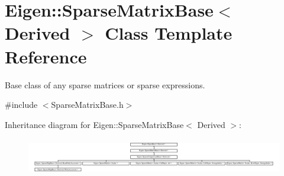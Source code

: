 \hypertarget{class_eigen_1_1_sparse_matrix_base}{}\section{Eigen\+::Sparse\+Matrix\+Base$<$ Derived $>$ Class Template Reference}
\label{class_eigen_1_1_sparse_matrix_base}


Base class of any sparse matrices or sparse expressions.  




{\ttfamily \#include $<$Sparse\+Matrix\+Base.\+h$>$}

Inheritance diagram for Eigen\+::Sparse\+Matrix\+Base$<$ Derived $>$\+:\begin{figure}[H]
\begin{center}
\leavevmode
\includegraphics[height=1.623188cm]{class_eigen_1_1_sparse_matrix_base}
\end{center}
\end{figure}
